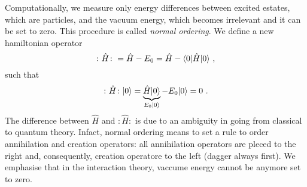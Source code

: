     Computationally, we measure only energy differences between excited estates, which are particles, and the vacuum energy, which becomes irrelevant and it can be set to zero. This procedure is called \textit{normal ordering}. We define a new hamiltonian operator 
    \begin{equation*}
        \colon \hat H \colon = \hat H - E_0 = \hat H - \langle0\vert \hat H \vert0\rangle ~,
    \end{equation*}
    such that 
    \begin{equation*}
        \colon \hat H \colon \vert0\rangle = \underbrace{\hat H \vert0\rangle}_{E_0 \vert0\rangle} - E_0 \vert0\rangle = 0~.
    \end{equation*}
    The difference between $\hat H$ and $\colon \hat H \colon$ is due to an ambiguity in going from classical to quantum theory. Infact, normal ordering means to set a rule to order annihilation and creation operators: all annihilation operators are pleced to the right and, consequently, creation operatore to the left (dagger always first). We emphasise that in the interaction theory, vaccume energy cannot be anymore set to zero.


